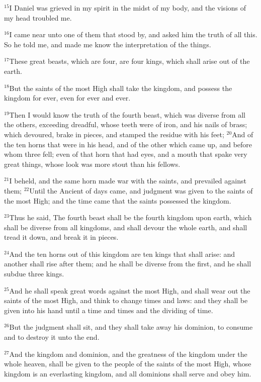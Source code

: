 \documentclass[12pt]{article}
\begin{document}
$^{15}$I Daniel was grieved in my spirit in the midst of my body, and
the visions of my head troubled me.


$^{16}$I came near unto one of them that stood by, and asked him the
truth of all this. So he told me, and made me know the interpretation
of the things.


$^{17}$These great beasts, which are four, are four kings, which shall
arise out of the earth.


$^{18}$But the saints of the most High shall take the kingdom, and
possess the kingdom for ever, even for ever and ever.


$^{19}$Then I would know the truth of the fourth beast, which was
diverse from all the others, exceeding dreadful, whose teeth were of
iron, and his nails of brass; which devoured, brake in pieces, and
stamped the residue with his feet; $^{20}$And of the ten horns that were
in his head, and of the other which came up, and before whom three
fell; even of that horn that had eyes, and a mouth that spake very
great things, whose look was more stout than his fellows.


$^{21}$I beheld, and the same horn made war with the saints, and
prevailed against them; $^{22}$Until the Ancient of days came, and
judgment was given to the saints of the most High; and the time came
that the saints possessed the kingdom.


$^{23}$Thus he said, The fourth beast shall be the fourth kingdom upon
earth, which shall be diverse from all kingdoms, and shall devour the
whole earth, and shall tread it down, and break it in pieces.


$^{24}$And the ten horns out of this kingdom are ten kings that shall
arise: and another shall rise after them; and he shall be diverse from
the first, and he shall subdue three kings.


$^{25}$And he shall speak great words against the most High, and shall
wear out the saints of the most High, and think to change times and
laws: and they shall be given into his hand until a time and times and
the dividing of time.


$^{26}$But the judgment shall sit, and they shall take away his
dominion, to consume and to destroy it unto the end.


$^{27}$And the kingdom and dominion, and the greatness of the kingdom
under the whole heaven, shall be given to the people of the saints of
the most High, whose kingdom is an everlasting kingdom, and all
dominions shall serve and obey him.
\end{document}
